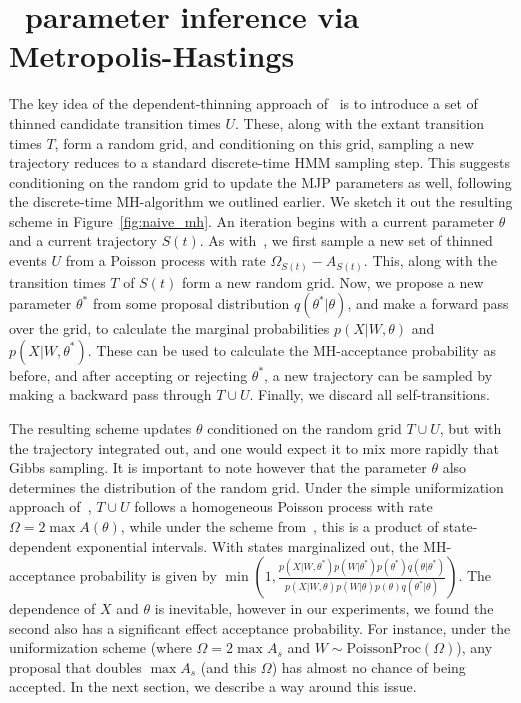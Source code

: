 \section{\Naive\ parameter inference via Metropolis-Hastings}

The key idea of the dependent-thinning approach of~\cite{RaoTeh13} is
to introduce a set of thinned candidate transition times $U$. These, along 
with the extant transition times $T$, form a random grid, and conditioning on
this grid, sampling a new trajectory reduces to a standard discrete-time 
HMM sampling step. This suggests conditioning on the random grid to update
the MJP parameters as well, following the discrete-time MH-algorithm we 
outlined earlier. 
We sketch it out the resulting scheme in Figure~\ref{fig:naive_mh}.
An iteration begins with a current parameter $\theta$ and a current
trajectory $S(t)$. As with~\cite{RaoTeh12}, we first sample
a new set of thinned events $U$ from a Poisson process with rate
$\Omega_{S(t)}-A_{S(t)}$. This, along with the transition times $T$ of
$S(t)$ form a new random grid. Now, we propose a new parameter 
$\theta^*$ from some proposal distribution $q(\theta^*|\theta)$,
and make a forward pass over the grid, to calculate the marginal
probabilities $p(X|W,\theta)$ and $p(X|W,\theta^*)$. These can be
used to calculate the MH-acceptance probability as before, and after accepting 
or rejecting $\theta^*$, a new trajectory can be sampled by making a backward 
pass through $T \cup U$. Finally, we discard all
self-transitions.

The resulting scheme updates $\theta$ conditioned on the random 
grid $T \cup U$, but with the trajectory integrated out, and one would expect it 
to mix more rapidly that Gibbs sampling. 
It is important to note however that the parameter $\theta$ also
determines the distribution of the random grid.
Under the simple uniformization approach
of~\cite{RaoTeh13}, 
$T\cup U$ follows a homogeneous Poisson process with rate $\Omega = 
2 \max A(\theta)$, while under the scheme from~\cite{RaoTeh12},
this is a product of state-dependent exponential intervals.
With states marginalized out, the MH-acceptance probability is given by $\min(1,
\frac{p(X|W,\theta^*)p(W|\theta^*)p(\theta^*)q(\theta|\theta^*)}
     {p(X|W,\theta)p(W|\theta)p(\theta)q(\theta^*|\theta)})$. 
The dependence of $X$ and $\theta$ is inevitable, however in our experiments,
we found the second also has a significant effect acceptance
probability. For instance, under the uniformization scheme (where
$\Omega = 2 \max A_s$ and $W \sim \text{PoissonProc}(\Omega)$),
any proposal that doubles $\max A_s$ (and this $\Omega$) has almost no
chance of being accepted.
In the next section, we describe a way around this
issue.

